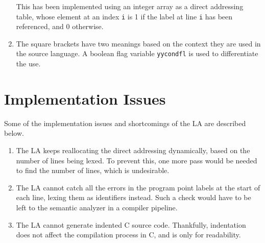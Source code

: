 \documentclass[journal,12pt,twocolumn]{IEEEtran}
\begin{document}
\begin{enumerate}
    This has been implemented using an integer array as a direct addressing
    table, whose element at an index \texttt{i} is 1 if the label at line
    \texttt{i} has been referenced, and 0 otherwise.
    \item The square brackets have two meanings based on the context they are
    used in the source language. A boolean flag variable \texttt{yycondfl} is
    used to differentiate the use.
\end{enumerate}

\section{Implementation Issues}
Some of the implementation issues and shortcomings of the LA are described
below.
\begin{enumerate}
    \item The LA keeps reallocating the direct addressing dynamically, based on
    the number of lines being lexed. To prevent this, one more pass would be
    needed to find the number of lines, which is undesirable.
    \item The LA cannot catch all the errors in the program point labels at the
    start of each line, lexing them as identifiers instead. Such a check would
    have to be left to the semantic analyzer in a compiler pipeline.
    \item The LA cannot generate indented C source code. Thankfully, indentation
    does not affect the compilation process in C, and is only for readability. 
\end{enumerate}
\end{document}
